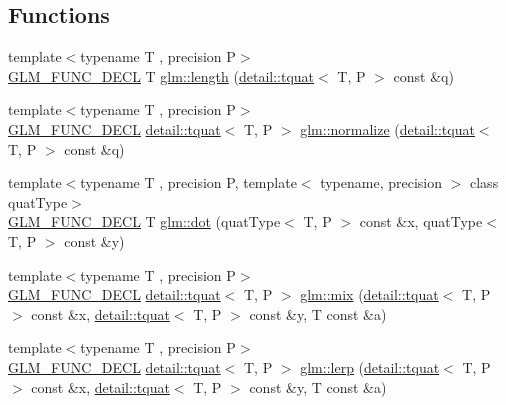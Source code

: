 \subsection*{Functions}
\begin{DoxyCompactItemize}
\item 
{\footnotesize template$<$typename T , precision P$>$ }\\\hyperlink{setup_8hpp_ab2d052de21a70539923e9bcbf6e83a51}{G\+L\+M\+\_\+\+F\+U\+N\+C\+\_\+\+D\+E\+CL} T \hyperlink{group__gtc__quaternion_ga3406ab83e2cafd4034f359957e942410}{glm\+::length} (\hyperlink{structglm_1_1detail_1_1tquat}{detail\+::tquat}$<$ T, P $>$ const \&q)
\item 
{\footnotesize template$<$typename T , precision P$>$ }\\\hyperlink{setup_8hpp_ab2d052de21a70539923e9bcbf6e83a51}{G\+L\+M\+\_\+\+F\+U\+N\+C\+\_\+\+D\+E\+CL} \hyperlink{structglm_1_1detail_1_1tquat}{detail\+::tquat}$<$ T, P $>$ \hyperlink{group__gtc__quaternion_ga34ee289ca53a08207904e935104715d8}{glm\+::normalize} (\hyperlink{structglm_1_1detail_1_1tquat}{detail\+::tquat}$<$ T, P $>$ const \&q)
\item 
{\footnotesize template$<$typename T , precision P, template$<$ typename, precision $>$ class quat\+Type$>$ }\\\hyperlink{setup_8hpp_ab2d052de21a70539923e9bcbf6e83a51}{G\+L\+M\+\_\+\+F\+U\+N\+C\+\_\+\+D\+E\+CL} T \hyperlink{group__gtc__quaternion_gac54dfc83de465a2d03e90d342242ab3d}{glm\+::dot} (quat\+Type$<$ T, P $>$ const \&x, quat\+Type$<$ T, P $>$ const \&y)
\item 
{\footnotesize template$<$typename T , precision P$>$ }\\\hyperlink{setup_8hpp_ab2d052de21a70539923e9bcbf6e83a51}{G\+L\+M\+\_\+\+F\+U\+N\+C\+\_\+\+D\+E\+CL} \hyperlink{structglm_1_1detail_1_1tquat}{detail\+::tquat}$<$ T, P $>$ \hyperlink{group__gtc__quaternion_gafabf175ae3e2cd30bf58dc313321955a}{glm\+::mix} (\hyperlink{structglm_1_1detail_1_1tquat}{detail\+::tquat}$<$ T, P $>$ const \&x, \hyperlink{structglm_1_1detail_1_1tquat}{detail\+::tquat}$<$ T, P $>$ const \&y, T const \&a)
\item 
{\footnotesize template$<$typename T , precision P$>$ }\\\hyperlink{setup_8hpp_ab2d052de21a70539923e9bcbf6e83a51}{G\+L\+M\+\_\+\+F\+U\+N\+C\+\_\+\+D\+E\+CL} \hyperlink{structglm_1_1detail_1_1tquat}{detail\+::tquat}$<$ T, P $>$ \hyperlink{group__gtc__quaternion_gafc1c989eaa2c786d34218b176f680fe0}{glm\+::lerp} (\hyperlink{structglm_1_1detail_1_1tquat}{detail\+::tquat}$<$ T, P $>$ const \&x, \hyperlink{structglm_1_1detail_1_1tquat}{detail\+::tquat}$<$ T, P $>$ const \&y, T const \&a)

\end{DoxyCompactItemize}
